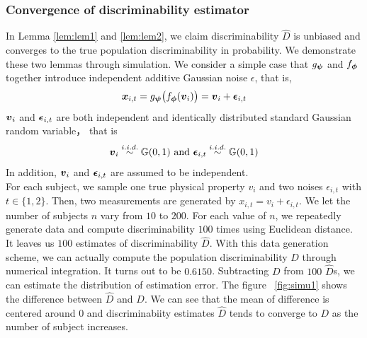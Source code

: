 \documentclass{article}
\begin{document}
\subsubsection{Convergence of discriminability estimator}
In Lemma \ref{lem:lem1} and  \ref{lem:lem2}, we claim discriminability $\hat{D}$ is unbiased and converges to  the true population discriminability in probability. We demonstrate these two lemmas through simulation. We consider a simple case that $g_{\boldsymbol{\psi}}$ and $f_{\boldsymbol{\phi}}$ together introduce independent additive Gaussian noise $\epsilon$, that is,
\begin{equation}
\boldsymbol{x}_{i,t} =g_{\boldsymbol{\psi}} \big(f_{\boldsymbol{\phi}} (\boldsymbol{v}_i) \big) =\boldsymbol{v}_{i} + \boldsymbol{\epsilon}_{i,t}
\end{equation}  
$\boldsymbol{v}_{i}$ and $\boldsymbol{\epsilon}_{i,t}$ are both independent and identically distributed standard Gaussian random variable， that is 
\[\boldsymbol{v}_i \overset{i.i.d.}{\sim} \mathbb{G}(0,1) \text{ and  }\boldsymbol{\epsilon}_{i,t} \overset{i.i.d.}{\sim} \mathbb{G}(0,1)\] 
In addition, $\boldsymbol{v}_{i}$ and $\boldsymbol{\epsilon}_{i,t}$ are assumed to be independent. \\
For each subject, we sample one true physical property $v_i$ and two noises $\epsilon_{i,t}$ with $t\in\{1,2\}$. Then, two measurements are generated by $x_{i,t} = v_{i} + \epsilon_{i,t}$. We let the number of subjects $n$ vary from $10$ to $200$. For each value of $n$, we repeatedly generate data and compute discriminability $100$ times using Euclidean distance. It leaves us $100$ estimates of discriminability $\hat{D}$. With this data generation scheme, we can actually compute the population discriminability $D$ through numerical integration. It turns out to be $0.6150$. Subtracting $D$ from $100$ $\hat{D}$s, we can estimate the distribution of estimation error. The figure ~\ref{fig:simu1} shows the difference between $\hat{D}$ and $D$. We can see that the mean of difference is centered around 0 and  discriminabiity estimates $\hat{D}$ tends to converge to $D$ as the number of subject increases.
\end{document}
